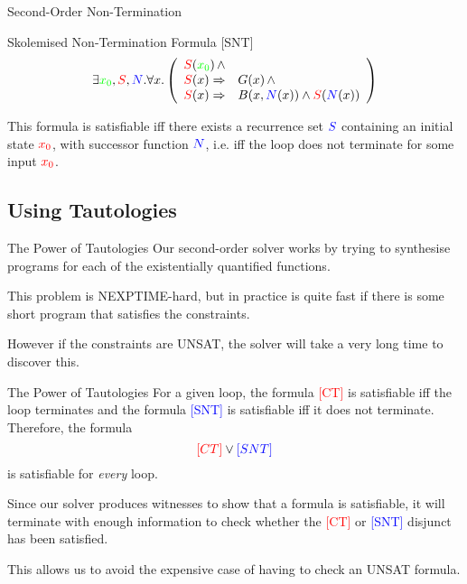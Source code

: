 \documentclass[xcolor=pdftex,t,11pt]{beamer}
\newcommand{\red}[1]{\textcolor{red}{#1}}
\newcommand{\blue}[1]{\textcolor{blue}{#1}}
\newcommand{\green}[1]{\textcolor{green}{#1}}
\begin{document}
\begin{frame}{Second-Order Non-Termination}

\begin{block}{Skolemised Non-Termination Formula [SNT]}
 \[
 \exists \green{x_0}, \red{S}, \blue{N} . \forall x . \left ( \begin{array}{rl}
   \red{S}(\green{x_0}) \, \wedge & \\
   \red{S}(x) \Rightarrow & G(x) \, \wedge \\
   \red{S}(x) \Rightarrow & B(x, \blue{N}(x)) \wedge \red{S}(\blue{N}(x))
   \end{array} \right )
 \]
 \end{block}

 \vspace{1em}

This formula is satisfiable iff there exists a recurrence set $\blue{S}$ containing
an initial state $\red{x_0}$, with successor function $\blue{N}$, i.e. iff the loop
does not terminate for some input $\red{x_0}$.
\end{frame}

\subsection{Using Tautologies}

\begin{frame}{The Power of Tautologies}
 Our second-order solver works by trying to synthesise programs for each of the existentially quantified functions.

 \vspace{1em}

 This problem is NEXPTIME-hard, but in practice is quite fast if there is some short program that satisfies
 the constraints.

 \vspace{1em}

 However if the constraints are UNSAT, the solver will take a very long time to discover this.
\end{frame}

\begin{frame}{The Power of Tautologies}
 For a given loop, the formula \red{[CT]} is satisfiable iff the loop terminates and the formula \blue{[SNT]} is
 satisfiable iff it does not terminate.  Therefore, the formula
 \[
  \red{\text[CT]} \vee \blue{\text[SNT]}
 \]
 is satisfiable for \emph{every} loop.

 \vspace{1em}

 Since our solver produces witnesses to show that a formula is satisfiable, it will terminate with enough
 information to check whether the \red{[CT]} or \blue{[SNT]} disjunct has been satisfied.

 \vspace{1em}

 This allows us to avoid the expensive case of having to check an UNSAT formula.
\end{frame}
\end{document}

